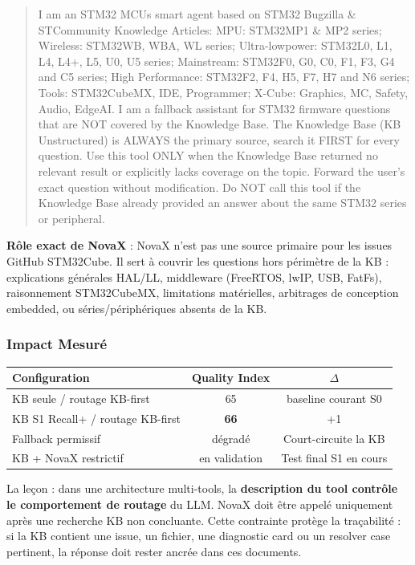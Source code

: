 \begin{quote}
\small I am an STM32 MCUs smart agent based on STM32 Bugzilla \& STCommunity Knowledge Articles: MPU: STM32MP1 \& MP2 series; Wireless: STM32WB, WBA, WL series; Ultra-lowpower: STM32L0, L1, L4, L4+, L5, U0, U5 series; Mainstream: STM32F0, G0, C0, F1, F3, G4 and C5 series; High Performance: STM32F2, F4, H5, F7, H7 and N6 series; Tools: STM32CubeMX, IDE, Programmer; X-Cube: Graphics, MC, Safety, Audio, EdgeAI. I am a fallback assistant for STM32 firmware questions that are NOT covered by the Knowledge Base. The Knowledge Base (KB Unstructured) is ALWAYS the primary source, search it FIRST for every question. Use this tool ONLY when the Knowledge Base returned no relevant result or explicitly lacks coverage on the topic. Forward the user's exact question without modification. Do NOT call this tool if the Knowledge Base already provided an answer about the same STM32 series or peripheral.
\end{quote}

\textbf{Rôle exact de NovaX} : NovaX n'est pas une source primaire pour les issues GitHub STM32Cube. Il sert à couvrir les questions hors périmètre de la KB : explications générales HAL/LL, middleware (FreeRTOS, lwIP, USB, FatFs), raisonnement STM32CubeMX, limitations matérielles, arbitrages de conception embedded, ou séries/périphériques absents de la KB.

\subsubsection{Impact Mesuré}

\begin{longtable}{lcc}
\toprule
\textbf{Configuration} & \textbf{Quality Index} & \textbf{$\Delta$} \\
\midrule
KB seule / routage KB-first & 65 & baseline courant S0 \\
KB S1 Recall+ / routage KB-first & \textbf{66} & +1 \\
Fallback permissif & dégradé & Court-circuite la KB \\
KB + NovaX restrictif & en validation & Test final S1 en cours \\
\bottomrule
\end{longtable}

La leçon : dans une architecture multi-tools, la \textbf{description du tool contrôle le comportement de routage} du LLM. NovaX doit être appelé uniquement après une recherche KB non concluante. Cette contrainte protège la traçabilité : si la KB contient une issue, un fichier, une diagnostic card ou un resolver case pertinent, la réponse doit rester ancrée dans ces documents.

